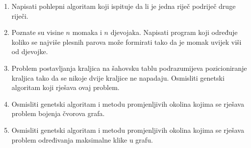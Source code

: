 \documentclass[a4paper, utf8, 11pt, colorlinks]{book}
\begin{document}
\begin{enumerate}
	\item  Napisati pohlepni algoritam koji ispituje da li je jedna riječ podriječ druge riječi.
	
	\item Poznate su visine $n$ momaka i $n$ djevojaka. Napisati program koji
	određuje koliko se najviše plesnih parova može formirati tako da je momak uvijek
	viši od djevojke.
	
	
	\item Problem postavljanja kraljica na šahovsku tablu podrazumijeva pozicioniranje kraljica tako da se nikoje dvije kraljice ne napadaju. Osmisliti genetski algoritam koji rješava ovaj problem.
	\item Osmisliti genetski algoritam i metodu promjenljivih okolina kojima se rješava problem bojenja čvorova grafa.
	
	\item Osmisliti genetski algoritam i metodu promjenljivih okolina kojima se rješava problem određivanja maksimalne klike u grafu.
	

\end{enumerate}
\end{document}
